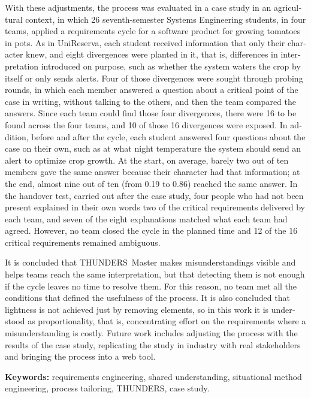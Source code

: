 \documentclass[12pt,letterpaper,oneside]{report}
\begin{document}
\begin{otherlanguage}{english}
With these adjustments, the process was evaluated in a case study in an
agricultural context, in which 26 seventh-semester Systems Engineering students,
in four teams, applied a requirements cycle for a software product for growing
tomatoes in pots. As in UniReserva, each student received information that only
their character knew, and eight divergences were planted in it, that is,
differences in interpretation introduced on purpose, such as whether the system
waters the crop by itself or only sends alerts. Four of those divergences were
sought through probing rounds, in which each member answered a question about a
critical point of the case in writing, without talking to the others, and then
the team compared the answers. Since each team could find those four
divergences, there were 16 to be found across the four teams, and 10 of those 16
divergences were exposed. In addition, before and after the cycle, each student
answered four questions about the case on their own, such as at what night
temperature the system should send an alert to optimize crop growth. At the
start, on average, barely two out of ten members gave the same answer because
their character had that information; at the end, almost nine out of ten (from
0.19 to 0.86) reached the same answer. In the handover test, carried out after
the case study, four people who had not been present explained in their own
words two of the critical requirements delivered by each team, and seven of the
eight explanations matched what each team had agreed. However, no team closed
the cycle in the planned time and 12 of the 16 critical requirements remained
ambiguous.

It is concluded that THUNDERS~Master makes misunderstandings visible and helps
teams reach the same interpretation, but that detecting them is not enough if
the cycle leaves no time to resolve them. For this reason, no team met all the
conditions that defined the usefulness of the process. It is also concluded
that lightness is not achieved just by removing elements, so in this work it is
understood as proportionality, that is, concentrating effort on the requirements
where a misunderstanding is costly. Future work includes adjusting the process
with the results of the case study, replicating the study in industry with real
stakeholders and bringing the process into a web tool.

\vspace{0.4cm}
\noindent\textbf{Keywords:} requirements engineering, shared understanding,
situational method engineering, process tailoring, THUNDERS, case study.
\end{otherlanguage}
\end{document}
